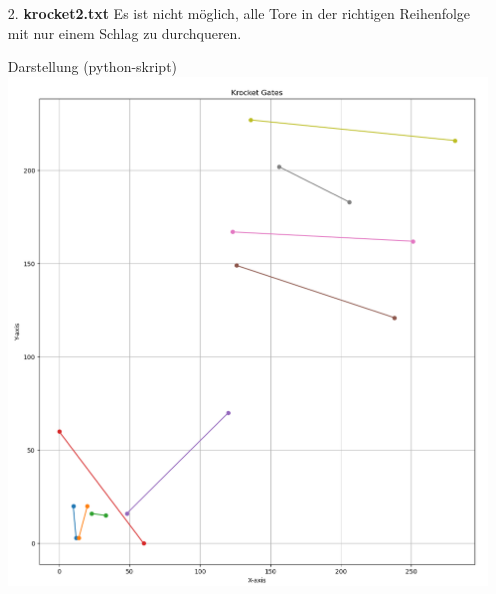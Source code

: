 \documentclass[a4paper,10pt,ngerman]{scrartcl}
\begin{document}
\begin{itemize}
  \item [2.] \textbf{krocket2.txt}
    \newline
    Es ist nicht möglich, alle Tore in der richtigen Reihenfolge mit nur einem Schlag zu durchqueren.

    Darstellung (python-skript)
    \newline
    \includegraphics[scale=0.27]{krocket2.png}

  \newpage


\end{itemize}
\end{document}
